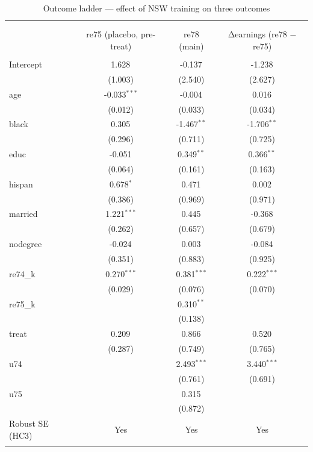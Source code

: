 \begin{table}[!htbp] \centering
  \caption{Outcome ladder — effect of NSW training on three outcomes}
\begin{tabular}{@{\extracolsep{5pt}}lccc}
\\[-1.8ex]\hline
\hline \\[-1.8ex]
\\[-1.8ex] & \multicolumn{1}{c}{re75 (placebo, pre-treat)} & \multicolumn{1}{c}{re78 (main)} & \multicolumn{1}{c}{Δearnings (re78 − re75)}  \\
\hline \\[-1.8ex]
 Intercept & 1.628$^{}$ & -0.137$^{}$ & -1.238$^{}$ \\
& (1.003) & (2.540) & (2.627) \\
 age & -0.033$^{***}$ & -0.004$^{}$ & 0.016$^{}$ \\
& (0.012) & (0.033) & (0.034) \\
 black & 0.305$^{}$ & -1.467$^{**}$ & -1.706$^{**}$ \\
& (0.296) & (0.711) & (0.725) \\
 educ & -0.051$^{}$ & 0.349$^{**}$ & 0.366$^{**}$ \\
& (0.064) & (0.161) & (0.163) \\
 hispan & 0.678$^{*}$ & 0.471$^{}$ & 0.002$^{}$ \\
& (0.386) & (0.969) & (0.971) \\
 married & 1.221$^{***}$ & 0.445$^{}$ & -0.368$^{}$ \\
& (0.262) & (0.657) & (0.679) \\
 nodegree & -0.024$^{}$ & 0.003$^{}$ & -0.084$^{}$ \\
& (0.351) & (0.883) & (0.925) \\
 re74_k & 0.270$^{***}$ & 0.381$^{***}$ & 0.222$^{***}$ \\
& (0.029) & (0.076) & (0.070) \\
 re75_k & & 0.310$^{**}$ & \\
& & (0.138) & \\
 treat & 0.209$^{}$ & 0.866$^{}$ & 0.520$^{}$ \\
& (0.287) & (0.749) & (0.765) \\
 u74 & & 2.493$^{***}$ & 3.440$^{***}$ \\
& & (0.761) & (0.691) \\
 u75 & & 0.315$^{}$ & \\
& & (0.872) & \\
 Robust SE (HC3) & Yes & Yes & Yes \\
\hline \\[-1.8ex]

\end{tabular}
\end{table}
